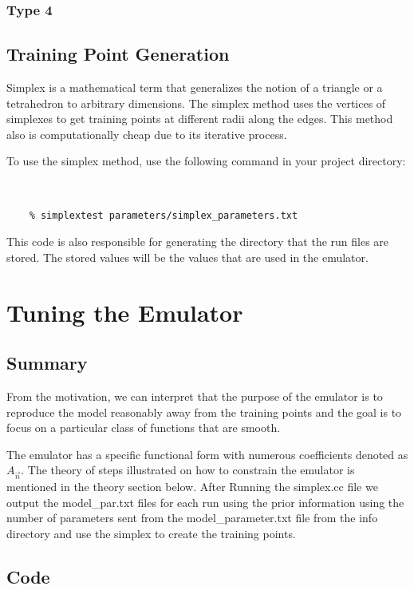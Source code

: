 \documentclass[12pt]{article}
\numberwithin{equation}{section}
\numberwithin{figure}{section}
\begin{document}
\subsubsection{Type 4}

\subsection{Training Point Generation}

Simplex is a mathematical term that generalizes the notion of a triangle or a tetrahedron to arbitrary dimensions. The simplex method uses the vertices of simplexes to get training points at different radii along the edges. This method also is computationally cheap due to its iterative process.

To use the simplex method, use the following command in your project directory:

{\tt
{
\begin{verbatim}
    % simplextest parameters/simplex_parameters.txt
\end{verbatim}
}}

This code is also responsible for generating the directory that the run files are stored. The stored values will be the values that are used in the emulator.

\section{Tuning the Emulator}

\subsection{Summary}

From the motivation, we can interpret that the purpose of the emulator is to reproduce the model reasonably away from the training points and the goal is to focus on a particular class of functions that are smooth. 

The emulator has a specific functional form with numerous coefficients denoted as $A_{\vec{n}}$. The theory of steps illustrated on how to constrain the emulator is mentioned in the theory section below.  After Running the simplex.cc file we output the model\_par.txt files for each run using the prior information using the number of parameters sent from the model\_parameter.txt file from the info directory and use the simplex to create the training points.

\subsection{Code}
\end{document}
